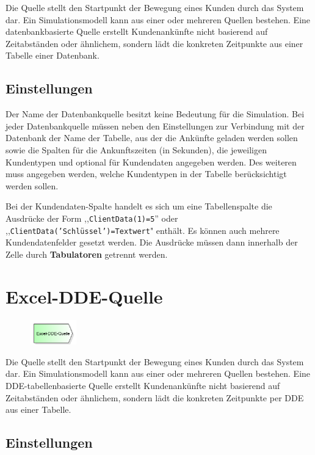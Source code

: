 Die Quelle stellt den Startpunkt der Bewegung eines Kunden durch das System dar.
Ein Simulationsmodell kann aus einer oder mehreren Quellen bestehen.
Eine datenbankbasierte Quelle erstellt Kundenankünfte nicht basierend auf
Zeitabständen oder ähnlichem, sondern lädt die konkreten Zeitpunkte aus einer
Tabelle einer Datenbank.

\subsection*{Einstellungen}

Der Name der Datenbankquelle besitzt keine Bedeutung für die Simulation.
Bei jeder Datenbankquelle müssen neben den Einstellungen zur Verbindung mit
der Datenbank der Name der Tabelle, aus der die Ankünfte geladen werden sollen
sowie die Spalten für die Ankunftszeiten (in Sekunden), die jeweiligen Kundentypen
und optional für Kundendaten angegeben werden. Des weiteren muss angegeben werden,
welche Kundentypen in der Tabelle berücksichtigt werden sollen.

Bei der Kundendaten-Spalte handelt es sich um eine Tabellenspalte die Ausdrücke
der Form ,,\texttt{ClientData(1)=5}'' oder ,,\texttt{ClientData('Schlüssel')=Textwert}"
enthält. Es können auch mehrere Kundendatenfelder gesetzt werden.
Die Ausdrücke müssen dann innerhalb der Zelle durch \textbf{Tabulatoren} getrennt werden. 


\section{Excel-DDE-Quelle}
\label{ref:ModelElementSourceDDE}

\begin{figure}
\vspace{-22pt}
\includegraphics[width=2cm]{imageModelElementSourceDDE.png}
\vspace{-22pt}
\end{figure}

Die Quelle stellt den Startpunkt der Bewegung eines Kunden durch das System dar.
Ein Simulationsmodell kann aus einer oder mehreren Quellen bestehen.
Eine DDE-tabellenbasierte Quelle erstellt Kundenankünfte nicht basierend auf
Zeitabständen oder ähnlichem, sondern lädt die konkreten Zeitpunkte per DDE
aus einer Tabelle.

\subsection*{Einstellungen}

